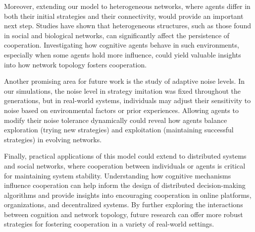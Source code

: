 \documentclass[runningheads]{llncs}
\begin{document}
Moreover, extending our model to heterogeneous networks, where agents differ in both their initial strategies and their connectivity, would provide an important next step. Studies have shown that heterogeneous structures, such as those found in social and biological networks, can significantly affect the persistence of cooperation. Investigating how cognitive agents behave in such environments, especially when some agents hold more influence, could yield valuable insights into how network topology fosters cooperation.

Another promising area for future work is the study of adaptive noise levels. In our simulations, the noise level in strategy imitation was fixed throughout the generations, but in real-world systems, individuals may adjust their sensitivity to noise based on environmental factors or prior experiences. Allowing agents to modify their noise tolerance dynamically could reveal how agents balance exploration (trying new strategies) and exploitation (maintaining successful strategies) in evolving networks.

Finally, practical applications of this model could extend to distributed systems and social networks, where cooperation between individuals or agents is critical for maintaining system stability. Understanding how cognitive mechanisms influence cooperation can help inform the design of distributed decision-making algorithms and provide insights into encouraging cooperation in online platforms, organizations, and decentralized systems. By further exploring the interactions between cognition and network topology, future research can offer more robust strategies for fostering cooperation in a variety of real-world settings.
\end{document}
